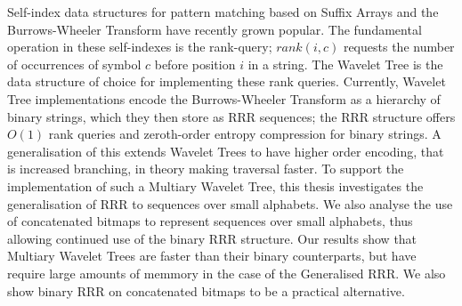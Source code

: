 Self-index data structures for pattern matching based on Suffix
Arrays and the Burrows-Wheeler Transform have recently grown
popular.
The fundamental operation in these self-indexes is the rank-query; $rank(i, c)$ 
requests the 
number of occurrences of symbol $c$ before position $i$ in a string. The Wavelet 
Tree is the data structure of choice for implementing these rank queries. 
Currently, Wavelet Tree implementations encode the Burrows-Wheeler Transform as 
a hierarchy of binary strings, which they then store as RRR sequences;
the RRR structure offers $O(1)$ rank queries and zeroth-order entropy compression for 
binary strings. A generalisation of this extends Wavelet Trees to have higher 
order encoding, that is increased branching, in theory making traversal faster. 
To support the implementation of such a Multiary
Wavelet Tree, this thesis investigates the generalisation of RRR to sequences 
over small alphabets. We also analyse the use of concatenated bitmaps to 
represent sequences over small alphabets, thus allowing continued use of the
binary RRR structure. Our results show that Multiary Wavelet Trees are faster
than their binary counterparts, but have require large amounts of memmory in the 
case of the Generalised RRR. We also show binary RRR on concatenated bitmaps to 
be a practical alternative.